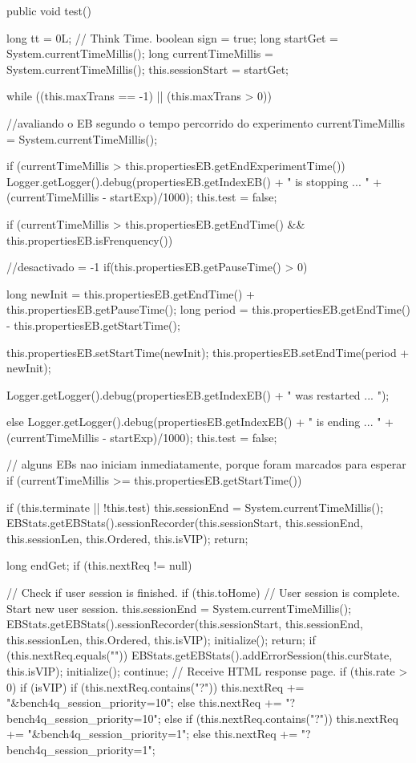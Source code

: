 \begin{codigo}[caption={Algoritmo de geração de carga modificado para modulação}, label={code:modelworkload}, breaklines=true]
public void test() {
	long tt = 0L; // Think Time.
	boolean sign = true;
	long startGet = System.currentTimeMillis();
	long currentTimeMillis = System.currentTimeMillis();
	this.sessionStart = startGet;
		
		
	while ((this.maxTrans == -1) || (this.maxTrans > 0)) {
			
		//avaliando o EB segundo o tempo percorrido do experimento
		currentTimeMillis = System.currentTimeMillis();
		
		if (currentTimeMillis > this.propertiesEB.getEndExperimentTime()){
			Logger.getLogger().debug(propertiesEB.getIndexEB() + " is stopping ... " + (currentTimeMillis - startExp)/1000);
			this.test = false;
		}
			
		if (currentTimeMillis > this.propertiesEB.getEndTime() && this.propertiesEB.isFrenquency()) {
			//desactivado = -1
			if(this.propertiesEB.getPauseTime() > 0){
				long newInit = this.propertiesEB.getEndTime() + this.propertiesEB.getPauseTime();
				long period = this.propertiesEB.getEndTime() - this.propertiesEB.getStartTime();
				
				this.propertiesEB.setStartTime(newInit);
				this.propertiesEB.setEndTime(period + newInit);
				
				Logger.getLogger().debug(propertiesEB.getIndexEB() + " was restarted  ... ");
			}else{
				Logger.getLogger().debug(propertiesEB.getIndexEB() + " is ending ... " + (currentTimeMillis - startExp)/1000);
				this.test = false;
			}
		}
		
		// alguns EBs nao iniciam inmediatamente, porque foram marcados para esperar
		if (currentTimeMillis >= this.propertiesEB.getStartTime()) {
			if (this.terminate || !this.test) {
				this.sessionEnd = System.currentTimeMillis();
				EBStats.getEBStats().sessionRecorder(this.sessionStart, this.sessionEnd, this.sessionLen,
				this.Ordered, this.isVIP);
				return;
			}
				
			long endGet;
			if (this.nextReq != null) {
				// Check if user session is finished.
				if (this.toHome) {
					// User session is complete. Start new user session.
					this.sessionEnd = System.currentTimeMillis();
					EBStats.getEBStats().sessionRecorder(this.sessionStart, this.sessionEnd, this.sessionLen,
					this.Ordered, this.isVIP);
					initialize();
					return;
				}
				if (this.nextReq.equals("")) {
					EBStats.getEBStats().addErrorSession(this.curState, this.isVIP);
					initialize();
					continue;
				}
				// Receive HTML response page.
				if (this.rate > 0) {
					if (isVIP) {
						if (this.nextReq.contains("?")) {
							this.nextReq += "&bench4q_session_priority=10";
						} else {
							this.nextReq += "?bench4q_session_priority=10";
						}
					} else if (this.nextReq.contains("?")) {
						this.nextReq += "&bench4q_session_priority=1";
					} else {
						this.nextReq += "?bench4q_session_priority=1";
					}
				}

}}}}
\end{codigo}
